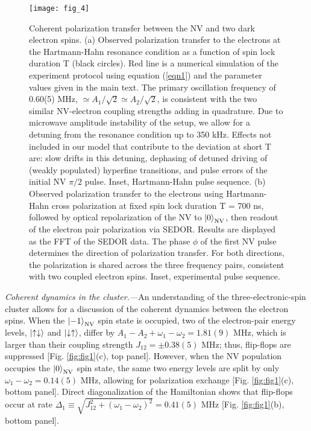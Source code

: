 \documentclass[%
 reprint,
 amsmath,amssymb,
 aps,
]{revtex4-1}
\begin{document}
\begin{figure}[h!]
\centering
\texttt{[image: fig\_4]}
\caption{\label{fig:fig4} Coherent polarization transfer between the NV and two dark electron spins. (a) Observed polarization transfer to the electrons at the Hartmann-Hahn resonance condition \cite{hartmann hahn} as a function of spin lock duration T (black circles). Red line is a numerical simulation of the experiment protocol using equation (\ref{eqn1}) and the parameter values given in the main text. The primary oscillation frequency of 0.60(5) MHz, $\simeq A_1/\sqrt{2}\simeq A_2/\sqrt{2}$, is consistent with the two similar NV-electron coupling strengths adding in quadrature. Due to microwave amplitude instability of the setup, we allow for a detuning from the resonance condition up to 350 kHz. Effects not included in our model that contribute to the deviation at short T are: slow drifts in this detuning, dephasing of detuned driving of (weakly populated) hyperfine transitions, and pulse errors of the initial NV $\pi/2$ pulse. Inset, Hartmann-Hahn pulse sequence. (b) Observed polarization transfer to the electrons using Hartmann-Hahn cross polarization at fixed spin lock duration T = 700 ns, followed by optical repolarization of the NV to $\ket{0}_{\text{NV}}$, then readout of the electron pair polarization via SEDOR. Results are displayed as the FFT of the SEDOR data. The phase $\phi$ of the first NV pulse determines the direction of polarization transfer. For both directions, the polarization is shared across the three frequency pairs, consistent with two coupled electron spins. Inset, experimental pulse sequence.}
\end{figure} 

\textit{Coherent dynamics in the cluster.---}An understanding of the three-electronic-spin cluster allows for a discussion of the coherent dynamics between the electron spins. When the $\ket{-1}_{\text{NV}}$ spin state is occupied, two of the electron-pair energy levels, $\ket{\uparrow\downarrow}$ and $\ket{\downarrow\uparrow}$, differ by $A_{1}-A_{2}+\omega_{1}-\omega_{2}=1.81(9)\text{ MHz}$, which is larger than their coupling strength $J_{12}=\pm0.38(5)\text{ MHz}$; thus, flip-flops are suppressed [Fig. \ref{fig:fig1}(c), top panel]. However, when the NV population occupies the $\ket{0}_{\text{NV}}$ spin state, the same two energy levels are split by only $\omega_{1}-\omega_2=0.14(5)\text{ MHz}$, allowing for polarization exchange [Fig. \ref{fig:fig1}(c), bottom panel]. Direct diagonalization of the Hamiltonian shows that flip-flops occur at rate $\Delta_1\equiv\sqrt{J_{12}^2+(\omega_1-\omega_2)^2}=0.41(5)\text{ MHz}$ [Fig. \ref{fig:fig1}(b), bottom panel].
\end{document}
